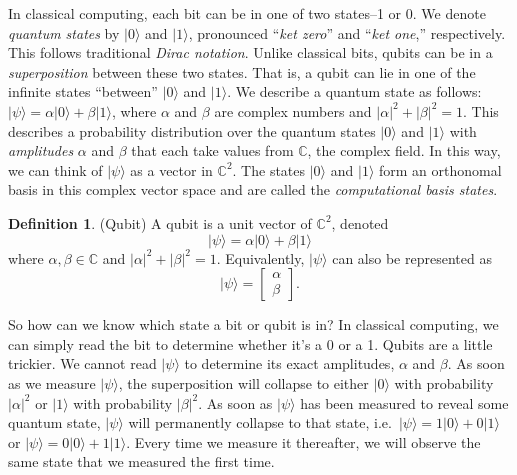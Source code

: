 \documentclass[12pt,twoside]{reedthesis}
\theoremstyle{definition}
\newtheorem{definition}[theorem]{Definition}
\newcommand{\C}{\mathbb{C}}
\newcommand{\ketz}{\ensuremath{\lvert 0\rangle}\xspace}
\newcommand{\keto}{\ensuremath{\lvert 1\rangle}\xspace}
\newcommand{\ket}[1]{\ensuremath{\lvert #1\rangle}\xspace}
\newcommand{\ketpsi}{\ensuremath{|\psi\rangle}\xspace}
\begin{document}
In classical computing, each bit can be in one of two states--1 or 0.  We denote \textit{quantum states} by \ketz and \keto, pronounced ``\textit{ket zero}'' and ``\textit{ket one},'' respectively. This follows traditional \textit{Dirac notation}. Unlike classical bits, qubits can be in a \textit{superposition} between these two states. That is, a qubit can lie in one of the infinite states ``between'' \ketz and \keto. We describe a quantum state as follows: $\ketpsi = \alpha \ketz + \beta \keto$, where $\alpha$ and $\beta$ are complex numbers and $\lvert \alpha \rvert ^2+ \lvert \beta \rvert ^2= 1$. This describes a probability distribution over the quantum states \ketz and \keto with \textit{amplitudes} $\alpha$ and $\beta$ that each take values from $\C$, the complex field. In this way, we can think of \ketpsi as a vector in $\C^2$. The states \ketz and \keto form an orthonomal basis in this complex vector space and are called the \textit{computational basis states}.
\begin{definition} (Qubit) A qubit is a unit vector of $\C^2$, denoted
\begin{equation*}
\ket{\psi} = \alpha\ketz + \beta\keto 
\end{equation*}
where $\alpha, \beta \in \C$ and $\lvert \alpha \rvert^2 + \lvert \beta \rvert^2 = 1$. Equivalently, $\ket{\psi}$ can also be represented as 
\begin{equation*}
\ket{\psi} = 
\begin{bmatrix}
\alpha \\
\beta
\end{bmatrix}.
\end{equation*}
\end{definition}
So how can we know which state a bit or qubit is in? In classical computing, we can simply read the bit to determine whether it's a 0 or a 1. Qubits are a little trickier. We cannot read \ketpsi to determine its exact amplitudes, $\alpha$ and $\beta$. As soon as we measure \ketpsi, the superposition will collapse to either \ketz with probability $ \lvert \alpha \rvert ^2$ or \keto with probability $ \lvert \beta \rvert ^2$. As soon as \ketpsi has been measured to reveal some quantum state, \ketpsi will permanently collapse to that state, i.e.~$\ketpsi = 1\ketz + 0 \keto$ or $\ketpsi = 0\ketz + 1\keto$. Every time we measure it thereafter, we will observe the same state that we measured the first time.
\end{document}
